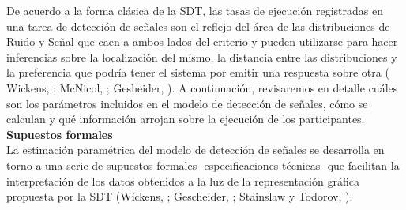 De acuerdo a la forma clásica de la SDT, las tasas de ejecución registradas en una tarea de detección de señales son el reflejo del área de las distribuciones de Ruido y Señal que caen a ambos lados del criterio y pueden utilizarse para hacer inferencias sobre la localización del mismo, la distancia entre las distribuciones y la preferencia que podría tener el sistema por emitir una respuesta sobre otra ( Wickens, \citeyear{Wickens1}; McNicol, \citeyear{McNicol1}; Gesheider, \citeyear{Gescheider}). A continuación, revisaremos en detalle cuáles son los parámetros incluidos en el modelo de detección de señales, cómo se calculan y qué información arrojan sobre la ejecución de los participantes.\\

  \textbf{Supuestos formales}\\

La estimación paramétrica del modelo de detección de señales se desarrolla en torno a una serie de supuestos formales -especificaciones técnicas- que facilitan la interpretación de los datos obtenidos a la luz de la representación gráfica propuesta por la SDT (Wickens, \citeyear{Wickens1}; Gescheider, \citeyear{Gescheider}; Stainslaw y Todorov, \citeyear{Stainslaw1999}).\\ 

